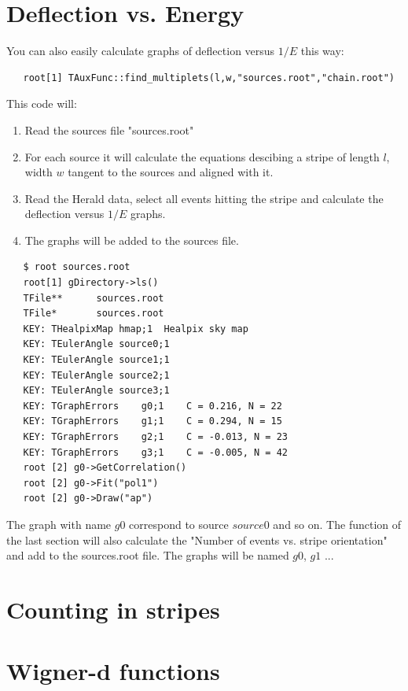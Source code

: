 \documentclass[12pt]{article}
\begin{document}
\section{Deflection vs. Energy} \label{ch::raios-cosmicos}
You can also easily calculate graphs of deflection versus $1/E$ this way:
{ \color{brown}
   \begin{lstlisting}
   root[1] TAuxFunc::find_multiplets(l,w,"sources.root","chain.root")
   \end{lstlisting}
}
This code will:
\begin{enumerate}
\item Read the sources file {\color{brown}"sources.root"}
\item For each source it will calculate the equations descibing a stripe of
length $l$, width $w$ tangent to the sources and aligned with it.
\item Read the Herald data, select all events hitting the stripe and calculate 
the deflection versus $1/E$ graphs.
\item The graphs will be added to the sources file.
\end{enumerate}


{ \color{brown}
   \begin{lstlisting}
   $ root sources.root
   root[1] gDirectory->ls()
   TFile**		sources.root	
   TFile*		sources.root	
   KEY: THealpixMap	hmap;1	Healpix sky map
   KEY: TEulerAngle	source0;1	
   KEY: TEulerAngle	source1;1	
   KEY: TEulerAngle	source2;1	
   KEY: TEulerAngle	source3;1	
   KEY: TGraphErrors	g0;1	C = 0.216, N = 22
   KEY: TGraphErrors	g1;1	C = 0.294, N = 15
   KEY: TGraphErrors	g2;1	C = -0.013, N = 23
   KEY: TGraphErrors	g3;1	C = -0.005, N = 42
   root [2] g0->GetCorrelation()
   root [2] g0->Fit("pol1")
   root [2] g0->Draw("ap")
   \end{lstlisting}
}

The graph with name $g0$ correspond to source $source0$ and so on.
The function of the last section will also calculate the "Number of events vs. stripe orientation"
and add to the sources.root file. The graphs will be named $g0$, $g1$ ...

\section{Counting in stripes} \label{ch::raios-cosmicos}


\section{Wigner-d functions}
\appendix
\end{document}

